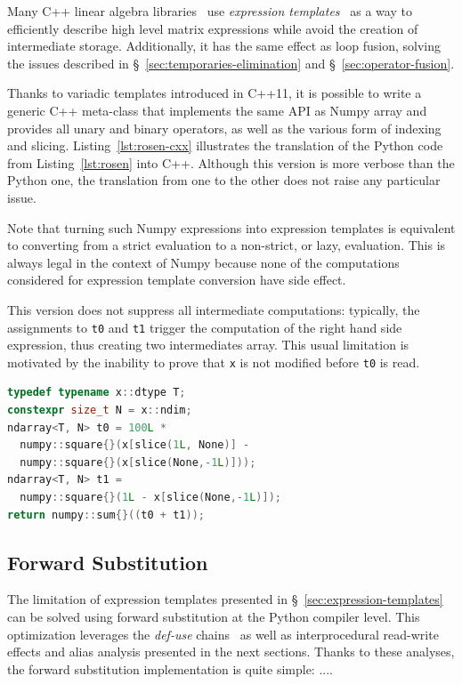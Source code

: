 \documentclass[10pt, preprint]{sigplanconf}
\begin{document}
Many C++ linear algebra libraries~\cite{eigen,ublas,esterie2014} use \emph{expression
templates}~\cite{expression_templates, et2012} as a way to efficiently describe high
level matrix expressions while avoid the creation of intermediate storage.
Additionally, it has the same effect as loop fusion, solving the issues
described in \S~\ref{sec:temporaries-elimination} and
\S~\ref{sec:operator-fusion}.

Thanks to variadic templates introduced in C++11, it is possible to write a
generic C++ meta-class that implements the same API as Numpy array and provides
all unary and binary operators, as well as the various form of indexing and
slicing. Listing~\ref{lst:rosen-cxx} illustrates the translation of the Python
code from Listing~\ref{lst:rosen} into C++. Although this version is more
verbose than the Python one, the translation from one to the other does not
raise any particular issue.

Note that turning such Numpy expressions into expression templates is
equivalent to converting from a strict evaluation to a non-strict, or lazy,
evaluation. This is always legal in the context of Numpy because none of the
computations considered for expression template conversion have side effect.

This version does not suppress all intermediate computations: typically, the
assignments to \texttt{t0} and \texttt{t1} trigger the computation of the right
hand side expression, thus creating two intermediates array. This usual
limitation is motivated by the inability to prove that \texttt{x} is not
modified before \texttt{t0} is read.

\begin{lstlisting}[language=c++, 
  caption={C++11 translated version of Python version for the Rosenbrock 
           kernel.}, 
  label={lst:rosen-cxx}, 
  breaklines=true,
  basicstyle=\small]
typedef typename x::dtype T;
constexpr size_t N = x::ndim;
ndarray<T, N> t0 = 100L * 
  numpy::square{}(x[slice(1L, None)] - 
  numpy::square{}(x[slice(None,-1L)]));
ndarray<T, N> t1 = 
  numpy::square{}(1L - x[slice(None,-1L)]);
return numpy::sum{}((t0 + t1));
\end{lstlisting}


\subsection{Forward Substitution}
\label{sec:fs}

The limitation of expression templates presented in
\S~\ref{sec:expression-templates} can be solved using forward substitution at 
the Python compiler level. This optimization leverages the 
\textit{def-use} chains~\cite{defuse} as well as interprocedural read-write 
effects and alias analysis presented in the next sections. 
Thanks to these analyses, the forward substitution implementation is quite 
simple: ....
\end{document}
